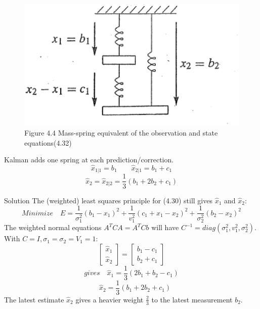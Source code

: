 	\begin{figure}[h]
		\centering
		\includegraphics[width=0.7\linewidth]{TeX_files/Part02/chapter04/image/4-4}
		\caption{Figure 4.4 Mass-spring equivalent of the observation and state equations(4.32)}
	\end{figure}
	
	Kalman adds one spring at each prediction/correction.
	\begin{equation*}
	\hat{x}_{1|1}=b_1  \qquad  \hat{x}_{2|1}=b_1+c_1
	\end{equation*}
	\begin{equation*}
	\hat{x}_2=\hat{x}_{2|2}=\frac{1}{3}(b_1+2b_2+c_1)
	\end{equation*}
	
	Solution\; The (weighted) least squares principle for (4.30) still gives $\hat{x}_1$ and $\hat{x}_2$:
	\begin{equation}
	Minimize \quad
	E=\frac{1}{\sigma^2_1}(b_1-x_1)^2+\frac{1}{v^2_1}(c_1+x_1-x_2)^2+\frac{1}{\sigma^2_2}(b_2-x_2)^2
	\end{equation}
	The weighted normal equations $A^TCA=A^TCb$ will have $C^{-1}=diag(\sigma^2_1,v^2_1,\sigma^2_2)$. With $C=I,\sigma_1=\sigma_2=V_1=1$:
	\begin{equation}
	\begin{bmatrix}
	\hat{x}_1  \\ \hat{x}_2
	\end{bmatrix}
	 =
	\begin{bmatrix}
	b_1-c_1  \\  b_2+c_1
	\end{bmatrix}
	\end{equation}
	\begin{equation*}
	gives \quad
	\hat{x}_1=\frac{1}{3}(2b_1+b_2-c_1)
	\end{equation*}
	\begin{equation*}
	\quad
	\hat{x}_2=\frac{1}{3}(b_1+2b_2+c_1)
	\end{equation*}
	The latest estimate $\hat{x}_2$ gives a heavier weight $\frac{2}{3}$ to the latest measurement $b_2$.
	
